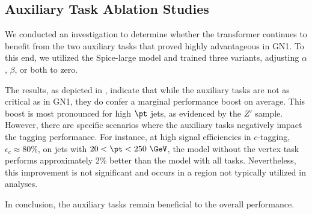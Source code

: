 \subsection{Auxiliary Task Ablation Studies}

We conducted an investigation to determine whether the transformer continues to benefit from the two auxiliary tasks that proved highly advantageous in GN1.
To this end, we utilized the Spice-large model and trained three variants, adjusting $\alpha$, $\beta$, or both to zero.

The results, as depicted in , indicate that while the auxiliary tasks are not as critical as in GN1, they do confer a marginal performance boost on average.
This boost is most pronounced for high $\pt$ jets, as evidenced by the $Z'$ sample.
However, there are specific scenarios where the auxiliary tasks negatively impact the tagging performance.
For instance, at high signal efficiencies in $c$-tagging, $\epsilon_c \approx 80\%$, on jets with $20 < \pt < 250~\GeV$, the model without the vertex task performs approximately 2\% better than the model with all tasks.
Nevertheless, this improvement is not significant and occurs in a region not typically utilized in analyses.

In conclusion, the auxiliary tasks remain beneficial to the overall performance.

